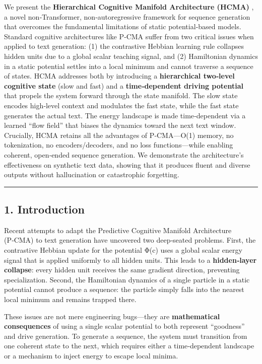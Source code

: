 \documentclass[
  11pt,
  a4paper,
]{article}
\begin{document}
We present the \textbf{Hierarchical Cognitive Manifold Architecture
(HCMA)} , a novel non‑Transformer, non‑autoregressive framework for
sequence generation that overcomes the fundamental limitations of static
potential‐based models. Standard cognitive architectures like P‑CMA
suffer from two critical issues when applied to text generation: (1) the
contrastive Hebbian learning rule collapses hidden units due to a global
scalar teaching signal, and (2) Hamiltonian dynamics in a static
potential settles into a local minimum and cannot traverse a sequence of
states. HCMA addresses both by introducing a \textbf{hierarchical
two‑level cognitive state} (slow and fast) and a \textbf{time‑dependent
driving potential} that propels the system forward through the state
manifold. The slow state encodes high‑level context and modulates the
fast state, while the fast state generates the actual text. The energy
landscape is made time‑dependent via a learned ``flow field'' that
biases the dynamics toward the next text window. Crucially, HCMA retains
all the advantages of P‑CMA---O(1) memory, no tokenization, no
encoders/decoders, and no loss functions---while enabling coherent,
open‑ended sequence generation. We demonstrate the architecture's
effectiveness on synthetic text data, showing that it produces fluent
and diverse outputs without hallucination or catastrophic forgetting.

\begin{center}\rule{0.5\linewidth}{0.5pt}\end{center}

\subsection{1. Introduction}\label{introduction}

Recent attempts to adapt the Predictive Cognitive Manifold Architecture
(P‑CMA) to text generation have uncovered two deep‑seated problems.
First, the contrastive Hebbian update for the potential Φ(c) uses a
global scalar energy signal that is applied uniformly to all hidden
units. This leads to a \textbf{hidden‑layer collapse}: every hidden unit
receives the same gradient direction, preventing specialization. Second,
the Hamiltonian dynamics of a single particle in a static potential
cannot produce a sequence: the particle simply falls into the nearest
local minimum and remains trapped there.

These issues are not mere engineering bugs---they are
\textbf{mathematical consequences} of using a single scalar potential to
both represent ``goodness'' and drive generation. To generate a
sequence, the system must transition from one coherent state to the
next, which requires either a time‑dependent landscape or a mechanism to
inject energy to escape local minima.
\end{document}
